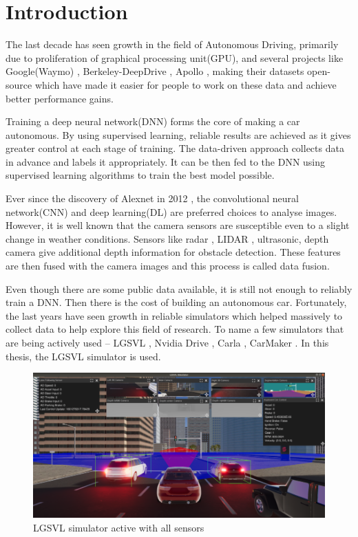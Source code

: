 \chapter{Introduction}

The last decade has seen growth in the field of Autonomous
Driving, primarily due to proliferation of graphical processing unit(GPU), and several projects like Google(Waymo) \cite{Waymo},
Berkeley-DeepDrive \cite{Berkeley-DeepDrive}, Apollo \cite{Apollo}, making their datasets
open-source which have made it easier for people to work on these data and achieve better performance gains.

Training a deep neural network(DNN) forms the core of making a car autonomous.
By using supervised learning, reliable results are achieved as it gives greater control
at each stage of training. The data-driven approach collects data in advance and labels it
appropriately. It can be then fed to the DNN using supervised
learning algorithms to train the best model possible.

Ever since the discovery of Alexnet in 2012 \cite{Alexnet2012}, the convolutional neural network(CNN) and
deep learning(DL) are preferred choices to analyse images.  However, it is well known that the camera sensors are susceptible even to a slight change in weather conditions.
Sensors like radar \cite{Radar}, LIDAR \cite{LIDAR}, ultrasonic\cite{ultrasonic}, depth camera
give additional depth information for obstacle detection. These features are then fused
with the camera images and this process is called data fusion.

Even though there are some public data available, it is still not enough to reliably
train a DNN. Then there is  the cost of building an autonomous car. Fortunately, the last
years have seen growth in reliable simulators which
helped massively to collect data to help explore this field of research.
To name a few simulators that are being actively used -- LGSVL \cite{rong2020lgsvl}, Nvidia Drive
\cite{NvidiaSimulator}, Carla \cite{CarlaSimulator}, CarMaker \cite{CarMaker}.
In this thesis, the LGSVL simulator is used.

\begin{figure}[h]
    \begin{center}
        \includegraphics[width=\textwidth]{figures/png/intro/scrot_lgsvl_2.png}
    \end{center}
    \caption{LGSVL\cite{rong2020lgsvl} simulator active with all sensors}
        \label{fig:LGSVL_constellation_sensors}
\end{figure}

